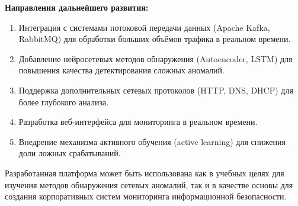\textbf{Направления дальнейшего развития:}

\begin{enumerate}
    \item Интеграция с системами потоковой передачи данных (Apache Kafka, RabbitMQ) для обработки больших объёмов трафика в реальном времени.
    \item Добавление нейросетевых методов обнаружения (Autoencoder, LSTM) для повышения качества детектирования сложных аномалий.
    \item Поддержка дополнительных сетевых протоколов (HTTP, DNS, DHCP) для более глубокого анализа.
    \item Разработка веб-интерфейса для мониторинга в реальном времени.
    \item Внедрение механизма активного обучения (active learning) для снижения доли ложных срабатываний.
\end{enumerate}

Разработанная платформа может быть использована как в учебных целях для изучения методов обнаружения сетевых аномалий, так и в качестве основы для создания корпоративных систем мониторинга информационной безопасности.
